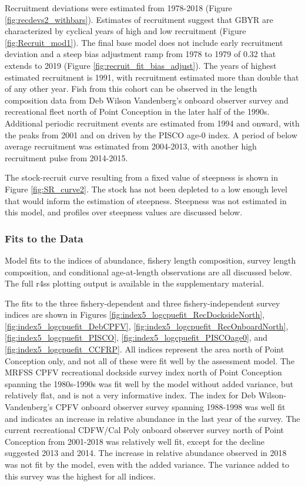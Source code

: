 \documentclass[12pt,]{article}
\begin{document}
Recruitment deviations were estimated from 1978-2018 (Figure
\ref{fig:recdevs2_withbars}). Estimates of recruitment suggest that GBYR
are characterized by cyclical years of high and low recruitment (Figure
\ref{fig:Recruit_mod1}). The final base model does not include early
recruitment deviation and a steep bias adjustment ramp from 1978 to 1979
of 0.32 that extends to 2019 (Figure \ref{fig:recruit_fit_bias_adjust}).
The years of highest estimated recruitment is 1991, with recruitment
estimated more than double that of any other year. Fish from this cohort
can be observed in the length composition data from Deb Wilson
Vandenberg's onboard observer survey and recreational fleet north of
Point Conception in the later half of the 1990s. Additional periodic
recruitment events are estimated from 1994 and onward, with the peaks
from 2001 and on driven by the PISCO age-0 index. A period of below
average recruitment was estimated from 2004-2013, with another high
recruitment pulse from 2014-2015.

The stock-recruit curve resulting from a fixed value of steepness is
shown in Figure \ref{fig:SR_curve2}. The stock has not been depleted to
a low enough level that would inform the estimation of steepness.
Steepness was not estimated in this model, and profiles over steepness
values are discussed below.

\subsubsection{Fits to the Data}\label{fits-to-the-data}

Model fits to the indices of abundance, fishery length composition,
survey length composition, and conditional age-at-length observations
are all discussed below. The full r4ss plotting output is available in
the supplementary material.

The fits to the three fishery-dependent and three fishery-independent
survey indices are shown in Figures
\ref{fig:index5_logcpuefit_RecDocksideNorth},
\ref{fig:index5_logcpuefit_DebCPFV},
\ref{fig:index5_logcpuefit_RecOnboardNorth},
\ref{fig:index5_logcpuefit_PISCO},
\ref{fig:index5_logcpuefit_PISCOage0}, and
\ref{fig:index5_logcpuefit_CCFRP}. All indices represent the area north
of Point Conception only, and not all of these were fit well by the
assessment model. The MRFSS CPFV recreational dockside survey index
north of Point Conception spanning the 1980s-1990s was fit well by the
model without added variance, but relatively flat, and is not a very
informative index. The index for Deb Wilson-Vandenberg's CPFV onboard
observer survey spanning 1988-1998 was well fit and indicates an
increase in relative abundance in the last year of the survey. The
current recreational CDFW/Cal Poly onboard observer survey north of
Point Conception from 2001-2018 was relatively well fit, except for the
decline suggested 2013 and 2014. The increase in relative abundance
observed in 2018 was not fit by the model, even with the added variance.
The variance added to this survey was the highest for all indices.
\end{document}
